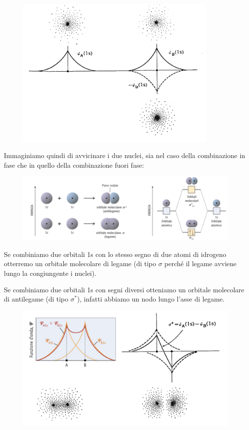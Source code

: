 \begin{figure}[H]
    \centering
    \includegraphics[width=10cm]{immagini/orbitali_atomici.png}
\end{figure}

Immaginiamo quindi di avvicinare i due nuclei, sia nel caso della combinazione in fase che in quello della combinazione fuori fase:

\begin{figure}[H]
    \centering
    \includegraphics[width=16cm]{immagini/orbitali_molecolari_H_2.png}
\end{figure}

Se combiniamo due orbitali 1s con lo stesso segno di due atomi di idrogeno otterremo un orbitale molecolare di legame (di tipo $\sigma$ perché il legame avviene lungo la congiungente i nuclei).

Se combiniamo due orbitali 1s con segni diversi otteniamo un orbitale molecolare di antilegame (di tipo $\sigma^*$), infatti abbiamo un nodo lungo l'asse di legame.

\begin{figure}[htp]
    \centering
    \includegraphics[width=12cm]{immagini/combinazione_funzioni.png}
\end{figure}

